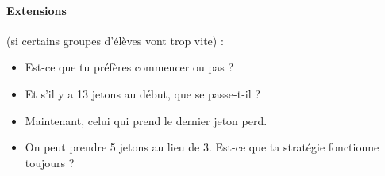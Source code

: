 \documentclass[12pt, a4paper]{article}
\begin{document}
	\paragraph*{Extensions} (si certains groupes d'élèves vont trop vite) :
	\begin{itemize}
		\item Est-ce que tu préfères commencer ou pas ?
		\item Et s'il y a 13 jetons au début, que se passe-t-il ?
		\item Maintenant, celui qui prend le dernier jeton perd.
		\item On peut prendre 5 jetons au lieu de 3. Est-ce que ta stratégie fonctionne toujours ?
	\end{itemize}
\end{document}
